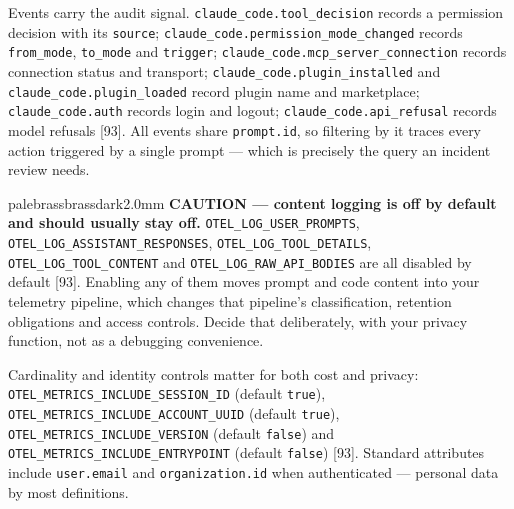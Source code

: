\documentclass[11pt,a4paper,twoside,openany]{book}
\begin{document}
Events carry the audit signal. \texttt{claude\_\allowbreak{}code.\allowbreak{}tool\_\allowbreak{}decision} records a permission decision with its \texttt{source}; \texttt{claude\_\allowbreak{}code.\allowbreak{}permission\_\allowbreak{}mode\_\allowbreak{}changed} records \texttt{from\_\allowbreak{}mode}, \texttt{to\_\allowbreak{}mode} and \texttt{trigger}; \texttt{claude\_\allowbreak{}code.\allowbreak{}mcp\_\allowbreak{}server\_\allowbreak{}connection} records connection status and transport; \texttt{claude\_\allowbreak{}code.\allowbreak{}plugin\_\allowbreak{}installed} and \texttt{claude\_\allowbreak{}code.\allowbreak{}plugin\_\allowbreak{}loaded} record plugin name and marketplace; \texttt{claude\_\allowbreak{}code.\allowbreak{}auth} records login and logout; \texttt{claude\_\allowbreak{}code.\allowbreak{}api\_\allowbreak{}refusal} records model refusals [93]. All events share \texttt{prompt.\allowbreak{}id}, so filtering by it traces every action triggered by a single prompt — which is precisely the query an incident review needs.


\begin{calloutbox}{palebrass}{brassdark}{2.0mm}
\textbf{CAUTION — content logging is off by default and should usually stay off.} \texttt{OTEL\_\allowbreak{}LOG\_\allowbreak{}USER\_\allowbreak{}PROMPTS}, \texttt{OTEL\_\allowbreak{}LOG\_\allowbreak{}ASSISTANT\_\allowbreak{}RESPONSES}, \texttt{OTEL\_\allowbreak{}LOG\_\allowbreak{}TOOL\_\allowbreak{}DETAILS}, \texttt{OTEL\_\allowbreak{}LOG\_\allowbreak{}TOOL\_\allowbreak{}CONTENT} and \texttt{OTEL\_\allowbreak{}LOG\_\allowbreak{}RAW\_\allowbreak{}API\_\allowbreak{}BODIES} are all disabled by default [93]. Enabling any of them moves prompt and code content into your telemetry pipeline, which changes that pipeline's classification, retention obligations and access controls. Decide that deliberately, with your privacy function, not as a debugging convenience.
\end{calloutbox}

Cardinality and identity controls matter for both cost and privacy: \texttt{OTEL\_\allowbreak{}METRICS\_\allowbreak{}INCLUDE\_\allowbreak{}SESSION\_\allowbreak{}ID} (default \texttt{true}), \texttt{OTEL\_\allowbreak{}METRICS\_\allowbreak{}INCLUDE\_\allowbreak{}ACCOUNT\_\allowbreak{}UUID} (default \texttt{true}), \texttt{OTEL\_\allowbreak{}METRICS\_\allowbreak{}INCLUDE\_\allowbreak{}VERSION} (default \texttt{false}) and \texttt{OTEL\_\allowbreak{}METRICS\_\allowbreak{}INCLUDE\_\allowbreak{}ENTRYPOINT} (default \texttt{false}) [93]. Standard attributes include \texttt{user.\allowbreak{}email} and \texttt{organizatio\allowbreak{}n.\allowbreak{}id} when authenticated — personal data by most definitions.
\end{document}
